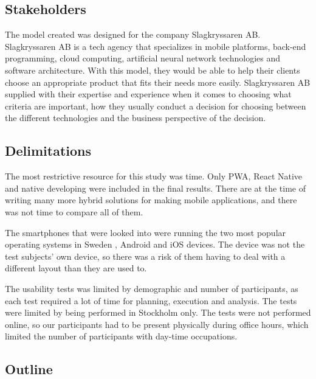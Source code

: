 \subsection{Stakeholders}

The model created was designed for the company Slagkryssaren AB.
Slagkryssaren AB is a tech agency that specializes in mobile platforms, back-end programming, cloud computing, artificial neural network technologies and software architecture. With this model, they would be able to help their clients choose an appropriate product that fits their needs more easily. Slagkryssaren AB supplied with their expertise and experience when it comes to choosing what criteria are important, how they usually conduct a decision for choosing between the different technologies and the business perspective of the decision.

\subsection{Delimitations}

The most restrictive resource for this study was time. Only PWA, React Native and native developing were included in the final results. There are at the time of writing many more hybrid solutions for making mobile applications, and there was not time to compare all of them. 

The smartphones that were looked into were running the two most popular operating systems in Sweden \cite{MarketShareSweden2020}, Android and iOS devices. The device was not the test subjects’ own device, so there was a risk of them having to deal with a different layout than they are used to. 

The usability tests was limited by demographic and number of participants, as each test required a lot of time for planning, execution and analysis. The tests were limited by being performed in Stockholm only. The tests were not performed online, so our participants had to be present physically during office hours, which limited the number of participants with day-time occupations. 

\subsection{Outline}

